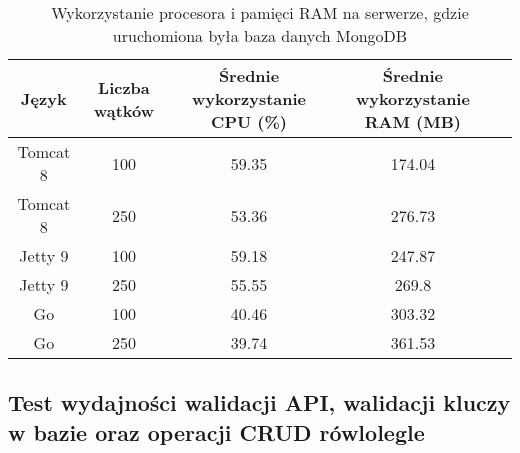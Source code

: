 \begin{table}[!htb]
\centering
\caption{Wykorzystanie procesora i pamięci RAM na serwerze, gdzie uruchomiona była baza danych MongoDB}
\label{tab:mongo-clean-crud}
\begin{tabular}{@{}ccccl@{}}
\toprule
\textbf{Język} & \textbf{Liczba wątków} & \multicolumn{1}{p{3cm}}{\textbf{Średnie wykorzystanie CPU (\%)}} & \multicolumn{1}{p{3cm}}{\textbf{Średnie wykorzystanie RAM (MB)}} &  \\ \midrule
Tomcat 8       & 100                    & 59.35                             & 174.04                          &  \\
Tomcat 8       & 250                    & 53.36                             & 276.73                          &  \\
Jetty 9       & 100                    & 59.18                             & 247.87                          &  \\
Jetty 9       & 250                    & 55.55                             & 269.8                          &  \\
Go       & 100                    & 40.46                             & 303.32                          &  \\
Go       & 250                    & 39.74                             & 361.53                          &  \\
\bottomrule
\end{tabular}
\end{table}

 \newpage
 \subsection{Test wydajności walidacji API, walidacji kluczy w bazie oraz operacji CRUD rówlolegle }
% 
 \clearpage

